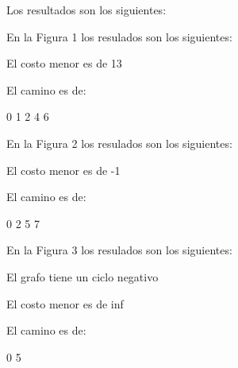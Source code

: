 \documentclass{report}
\begin{document}
\newpage
Los resultados son los siguientes: 

\begin{minipage}[b]{0.3\linewidth}

En la Figura 1 los resulados  son los siguientes:

El costo menor es de 13

El camino es de: 

0 1 2 4 6 
  \end{minipage}
  \hspace{0.5cm}
\begin{minipage}[b]{0.3\linewidth}
En la Figura 2 los resulados  son los siguientes:


  El costo menor es de -1

El camino es de: 

0 2 5 7 
\end{minipage}
\hspace{0.5cm}
\begin{minipage}[b]{0.3\linewidth}
En la Figura 3 los  resulados  son los siguientes:

  El grafo tiene un ciclo  negativo 

El costo menor es de inf 

El camino es de: 

0 5 
  \end{minipage}
\end{document}
